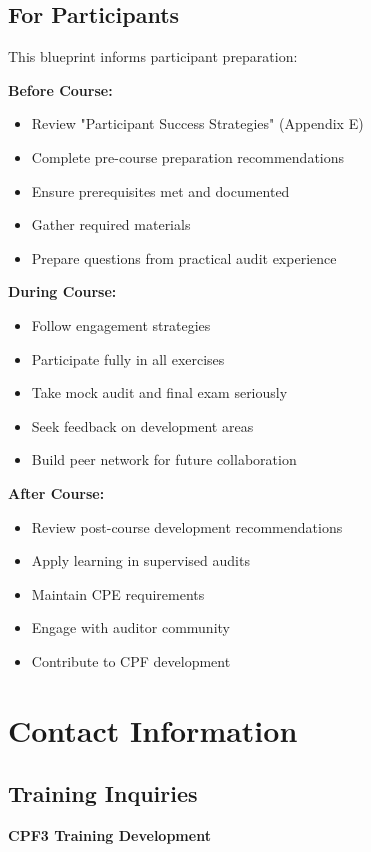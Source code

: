 \documentclass[11pt,a4paper]{article}
\begin{document}
\subsection{For Participants}

This blueprint informs participant preparation:

\textbf{Before Course:}
\begin{itemize}
\item Review "Participant Success Strategies" (Appendix E)
\item Complete pre-course preparation recommendations
\item Ensure prerequisites met and documented
\item Gather required materials
\item Prepare questions from practical audit experience
\end{itemize}

\textbf{During Course:}
\begin{itemize}
\item Follow engagement strategies
\item Participate fully in all exercises
\item Take mock audit and final exam seriously
\item Seek feedback on development areas
\item Build peer network for future collaboration
\end{itemize}

\textbf{After Course:}
\begin{itemize}
\item Review post-course development recommendations
\item Apply learning in supervised audits
\item Maintain CPE requirements
\item Engage with auditor community
\item Contribute to CPF development
\end{itemize}

\section{Contact Information}

\subsection{Training Inquiries}

\textbf{CPF3 Training Development}
\end{document}
